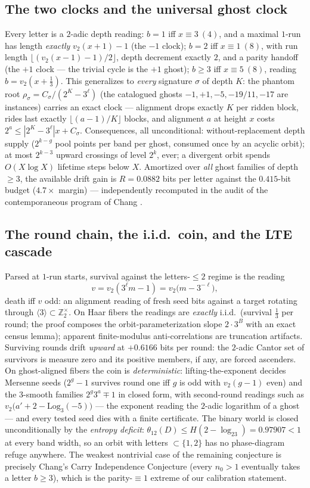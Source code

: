 \documentclass[11pt]{article}
\newcommand{\Z}{\mathbb Z}
\newcommand{\vt}{v_2}
\begin{document}
\subsection{The two clocks and the universal ghost clock}
Every letter is a $2$-adic depth reading: $b=1$ iff $x\equiv3\ (4)$,
and a maximal $1$-run has length \emph{exactly} $\vt(x+1)-1$ (the
$-1$ clock); $b=2$ iff $x\equiv1\ (8)$, with run length
$\lfloor(\vt(x-1)-1)/2\rfloor$, depth decrement exactly $2$, and a
parity handoff (the $+1$ clock --- the trivial cycle is the $+1$
ghost); $b\ge3$ iff $x\equiv5\ (8)$, reading $b=\vt(x+\tfrac13)$.
This generalizes to \emph{every} signature $\sigma$ of depth $K$:
the phantom root $\rho_\sigma=C_\sigma/(2^K-3^\ell)$ (the catalogued
ghosts $-1,+1,-5,-19/11,-17$ are instances) carries an exact clock ---
alignment drops exactly $K$ per ridden block, rides last exactly
$\lfloor(a-1)/K\rfloor$ blocks, and alignment $a$ at height $x$ costs
$2^a\le|2^K-3^\ell|x+C_\sigma$.  Consequences, all unconditional:
without-replacement depth supply ($2^{k-g}$ pool points per band per
ghost, consumed once by an acyclic orbit); at most $2^{k-3}$ upward
crossings of level $2^k$, ever; a divergent orbit spends
$O(X\log X)$ lifetime steps below $X$.  Amortized over \emph{all}
ghost families of depth $\ge3$, the available drift gain is
$R=0.0882$ bits per letter against the $0.415$-bit budget
($4.7\times$ margin) --- independently recomputed in the audit of the
contemporaneous program of Chang \cite{Chang}.

\subsection{The round chain, the i.i.d.\ coin, and the LTE cascade}
Parsed at $1$-run starts, survival against the letters-$\le2$ regime
is the reading
\[
  v=\vt(3^\ell m-1)=\vt\bigl(m-3^{-\ell}\bigr),
\]
death iff $v$ odd: an alignment reading of fresh seed bits against a
target rotating through $\langle3\rangle\subset\Z_2^\times$.  On Haar
fibers the readings are \emph{exactly} i.i.d.\ (survival $\tfrac13$
per round; the proof composes the orbit-parameterization slope
$2\cdot3^{B}$ with an exact census lemma); apparent finite-modulus
anti-correlations are truncation artifacts.  Surviving rounds drift
\emph{upward} at $+0.6166$ bits per round: the $2$-adic Cantor set of
survivors is measure zero and its positive members, if any, are forced
ascenders.  On ghost-aligned fibers the coin is \emph{deterministic}:
lifting-the-exponent decides Mersenne seeds ($2^g-1$ survives round
one iff $g$ is odd with $\vt(g-1)$ even) and the $3$-smooth families
$2^g3^a\mp1$ in closed form, with second-round readings such as
$\vt\bigl(a'+2-\mathrm{Log}_3(-5)\bigr)$ --- the exponent reading the
$2$-adic logarithm of a ghost --- and every tested seed dies with a
finite certificate.  The binary world is closed unconditionally by the
\emph{entropy deficit}: $\theta_{12}(D)\le H(2-\log_23)=0.97907<1$ at
every band width, so an orbit with letters $\subset\{1,2\}$ has no
phase-diagram refuge anywhere.  The weakest nontrivial case of the
remaining conjecture is precisely Chang's Carry Independence
Conjecture (every $n_0>1$ eventually takes a letter $b\ge3$), which is
the parity-$\equiv1$ extreme of our calibration statement.
\end{document}
